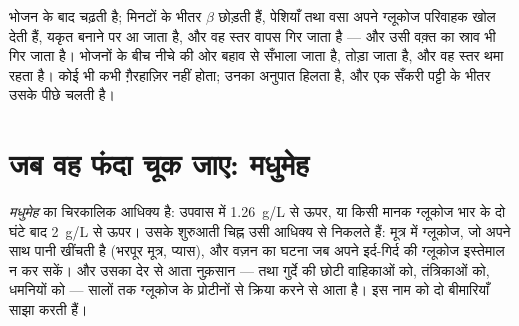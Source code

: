 \begin{example}[काम पर वह फंदा]\label{ex:g12:glucose-and-diabetes:loop}
भोजन के बाद  चढ़ती है; मिनटों के भीतर $\beta$  
छोड़ती हैं, पेशियाँ तथा वसा  अपने ग्लूकोज परिवाहक खोल देती हैं,
यकृत  बनाने पर आ जाता है, और वह स्तर वापस गिर जाता है --- और उसी
वक़्त  का स्राव भी गिर जाता है। भोजनों के बीच नीचे की ओर बहाव
 से सँभाला जाता है,  तोड़ा जाता है, और वह स्तर थमा रहता
है। कोई भी  कभी ग़ैरहाज़िर नहीं होता; उनका अनुपात हिलता है, और
 एक सँकरी पट्टी के भीतर उसके पीछे चलती है।
\end{example}

\section{जब वह फंदा चूक जाए: मधुमेह}

\begin{definition}[मधुमेह]\label{def:g12:glucose-and-diabetes:diabetes}
\emph{मधुमेह}  का चिरकालिक आधिक्य है: उपवास में
\qty{1.26}{g/L} से ऊपर, या किसी मानक ग्लूकोज भार के दो घंटे बाद
\qty{2}{g/L} से ऊपर। उसके शुरुआती चिह्न उसी आधिक्य से निकलते हैं: मूत्र में
ग्लूकोज, जो अपने साथ पानी खींचती है (भरपूर मूत्र, प्यास), और वज़न का घटना
जब  अपने इर्द-गिर्द की ग्लूकोज इस्तेमाल न कर सकें। और उसका देर से
आता नुक़सान ---  तथा गुर्दे की छोटी वाहिकाओं को, तंत्रिकाओं को, धमनियों
को --- सालों तक ग्लूकोज के प्रोटीनों से क्रिया करने से आता है। इस नाम को दो
बीमारियाँ साझा करती हैं।
\end{definition}

